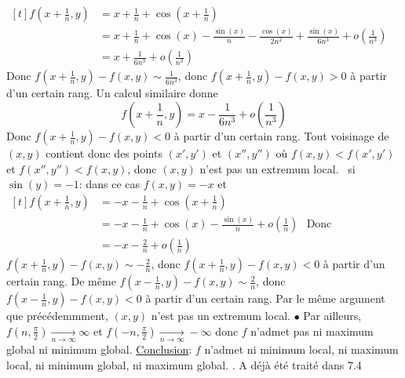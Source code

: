 \documentclass{report}
\begin{document}
 $\begin{aligned}[t] f(x+\frac{1}{n},y) &= x + \frac{1}{n} + \cos\left( x+\frac 1n \right) \\
&= x+\frac 1n + \cos(x) -\frac{\sin(x)}{n} -\frac{\cos(x)}{2n^2}+\frac{\sin(x)}{6n^3}+o\left( \frac{1}{n^3}\right) \\
&= x + \frac{1}{6n^3} + o\left( \frac{1}{n^3}\right) 
 \end{aligned}$ \newline
Donc $f(x+\frac{1}{n},y) - f(x,y)\sim \frac{1}{6n^3}$, donc $f(x+\frac{1}{n},y) - f(x,y)> 0$ à partir d'un certain rang.\newline
Un calcul similaire donne $$f(x+\frac{1}{n},y)=x - \frac{1}{6n^3} + o\left( \frac{1}{n^3}\right) $$
Donc $f(x+\frac{1}{n},y) - f(x,y)< 0$ à partir d'un certain rang. \newline
Tout voisinage de $(x,y)$ contient donc des points $(x',y')$ et $(x'',y'')$ où $f(x,y)<f(x',y')$ et $f(x'',y'')<f(x,y)$, donc $(x,y)$ n'est pas un extremum local. \newline 
\textopenbullet \, si $\sin(y)=-1$: dans ce cas $f(x,y)=-x$ et \newline
$\begin{aligned}[t] f(x+\frac{1}{n},y) &= -x -\frac{1}{n} + \cos\left( x+\frac 1n \right) \\
&= -x-\frac 1n + \cos(x) -\frac{\sin(x)}{n} + o\left(\frac{1}{n}\right) \\
&= -x - \frac{2}{n} + o\left( \frac{1}{n}\right) 
 \end{aligned}$ \newline
 Donc $f(x+\frac{1}{n},y) - f(x,y)\sim -\frac{2}{n}$, donc $f(x+\frac{1}{n},y) - f(x,y)< 0$ à partir d'un certain rang.
De même $f(x-\frac{1}{n},y) - f(x,y)\sim \frac{2}{n}$, donc $f(x-\frac{1}{n},y) - f(x,y)< 0$ à partir d'un certain rang. Par le même argument que précédemmment, $(x,y)$ n'est pas un extremum local. \newline
\newline 
$\bullet$ Par ailleurs, $f(n,\frac{\pi}2)\xrightarrow[n\to \infty]{}\infty$ et $f(-n,\frac{\pi}2)\xrightarrow[n\to \infty]{}-\infty$ donc $f$ n'admet pas ni maximum global ni minimum global.\newline \newline 
\underline{Conclusion}: $f$ n'admet ni minimum local, ni maximum local, ni minimum global, ni maximum global.
\newline 
{}. A déjà été traité dans 7.4 \newline
\end{document}
